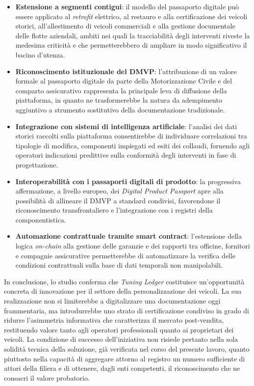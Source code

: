 \begin{itemize}
    \item \textbf{Estensione a segmenti contigui}: il modello del passaporto digitale pu\`o essere applicato al \textit{retrofit} elettrico, al restauro e alla certificazione dei veicoli storici, all'allestimento di veicoli commerciali e alla gestione documentale delle flotte aziendali, ambiti nei quali la tracciabilit\`a degli interventi riveste la medesima criticit\`a e che permetterebbero di ampliare in modo significativo il bacino d'utenza.

    \item \textbf{Riconoscimento istituzionale del DMVP}: l'attribuzione di un valore formale al passaporto digitale da parte della Motorizzazione Civile e del comparto assicurativo rappresenta la principale leva di diffusione della piattaforma, in quanto ne trasformerebbe la natura da adempimento aggiuntivo a strumento sostitutivo della documentazione tradizionale.

    \item \textbf{Integrazione con sistemi di intelligenza artificiale}: l'analisi dei dati storici raccolti sulla piattaforma consentirebbe di individuare correlazioni tra tipologie di modifica, componenti impiegati ed esiti dei collaudi, fornendo agli operatori indicazioni predittive sulla conformit\`a degli interventi in fase di progettazione.

    \item \textbf{Interoperabilit\`a con i passaporti digitali di prodotto}: la progressiva affermazione, a livello europeo, dei \textit{Digital Product Passport} apre alla possibilit\`a di allineare il DMVP a standard condivisi, favorendone il riconoscimento transfrontaliero e l'integrazione con i registri della componentistica.

    \item \textbf{Automazione contrattuale tramite smart contract}: l'estensione della logica \textit{on-chain} alla gestione delle garanzie e dei rapporti tra officine, fornitori e compagnie assicurative permetterebbe di automatizzare la verifica delle condizioni contrattuali sulla base di dati temporali non manipolabili.
\end{itemize}

In conclusione, lo studio conferma che \textit{Tuning Ledger} costituisce un'opportunit\`a concreta di innovazione per il settore della personalizzazione dei veicoli. La sua realizzazione non si limiterebbe a digitalizzare una documentazione oggi frammentaria, ma introdurrebbe uno strato di certificazione condiviso in grado di ridurre l'asimmetria informativa che caratterizza il mercato post-vendita, restituendo valore tanto agli operatori professionali quanto ai proprietari dei veicoli. La condizione di successo dell'iniziativa non risiede pertanto nella sola solidit\`a tecnica della soluzione, gi\`a verificata nel corso del presente lavoro, quanto piuttosto nella capacit\`a di aggregare attorno al registro un numero sufficiente di attori della filiera e di ottenere, dagli enti competenti, il riconoscimento che ne consacri il valore probatorio.
